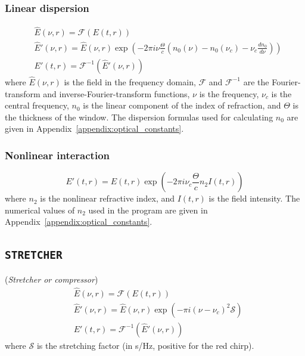\documentclass{report}
\begin{document}
\subsubsection*{Linear dispersion}
\begin{equation}
\begin{aligned}
&\widehat{E}(\nu,r) = \mathcal{F}(E(t,r))\\
&\widehat{E}'(\nu,r) = \widehat{E}(\nu,r) \exp \left( - 2 \pi i \nu \frac{\Theta}{c} \left(n_0(\nu)-n_0(\nu_c) -\nu_c \frac{d n_0}{d\nu}\right) \right)\\
&E'(t,r) = \mathcal{F}^{-1}(\widehat{E}'(\nu,r))
\end{aligned}
\end{equation}
where $\widehat{E}(\nu,r)$ is the field in the frequency domain, $\mathcal{F}$ and $\mathcal{F}^{-1}$ are the Fourier-transform and inverse-Fourier-transform functions, $\nu$ is the frequency, $\nu_c$ is the central frequency, $n_0$ is the linear component of the index of refraction, and $\Theta$ is the thickness of the window. The dispersion formulas used for calculating $n_0$ are given in Appendix~\ref{appendix:optical_constants}.
\subsubsection*{Nonlinear interaction}
\begin{equation}
E'(t,r) = E(t,r) \exp\left(-2\pi i \nu_c \frac{\Theta}{c} n_2 I(t,r)\right)
\end{equation}
where $n_2$ is the nonlinear refractive index, and $I(t,r)$ is the field intensity. The numerical values of $n_2$ used in the program are given in Appendix~\ref{appendix:optical_constants}.

\subsection*{\texttt{STRETCHER}}
(\textit{Stretcher or compressor})
\begin{equation}
\begin{aligned}
&\widehat{E}(\nu,r) = \mathcal{F}(E(t,r))\\
&\widehat{E}'(\nu,r) = \widehat{E}(\nu,r) \exp\left(- \pi i (\nu-\nu_c)^2  \mathcal{S}\right)\\
&E'(t,r) = \mathcal{F}^{-1}(\widehat{E}'(\nu,r))
\end{aligned}
\end{equation}
where $\mathcal{S}$ is the stretching factor (in s/Hz, positive for the red chirp).
\end{document}
